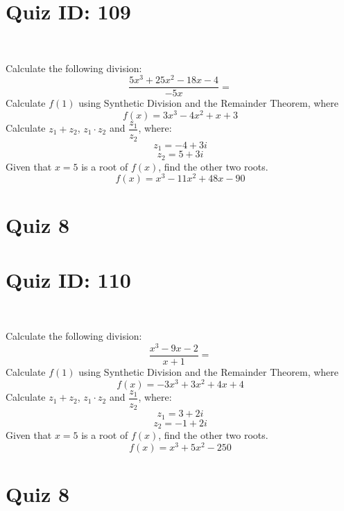 \documentclass{exam}
\begin{document}
\section*{Quiz ID: 109}
\vspace{0.5cm}\
\vspace{1cm}\
\begin{questions}
\question Calculate the following division:\[\dfrac{
5x^3 + 25x^2 - 18x - 4}{
-5x}=\] \makeemptybox{\stretch{2}}
\question Calculate $f(1)$ using Synthetic Division and the Remainder Theorem, where\[f(x) = 
3x^3 - 4x^2 + x + 3\]
\newpage\question Calculate $z_1+z_2$, $z_1\cdot z_2$ and $\dfrac{z_1}{z_2}$, where:\[z_1=-4+3\mathit{i}\]\[z_2=5+3\mathit{i}\]
\question Given that $x=5$ is a root of $f(x)$, find the other two roots.\[f(x)=
x^3 - 11x^2 + 48x - 90\]\makeemptybox{\stretch{1}}
\end{questions}\newpage
\newpage
\section*{Quiz 8}
\section*{Quiz ID: 110}
\vspace{0.5cm}\
\vspace{1cm}\
\begin{questions}
\question Calculate the following division:\[\dfrac{
x^3 - 9x - 2}{
x + 1}=\] 
\question Calculate $f(1)$ using Synthetic Division and the Remainder Theorem, where\[f(x) = 
-3x^3 + 3x^2 + 4x + 4\]
\newpage\question Calculate $z_1+z_2$, $z_1\cdot z_2$ and $\dfrac{z_1}{z_2}$, where:\[z_1=3+2\mathit{i}\]\[z_2=-1+2\mathit{i}\]\makeemptybox{\stretch{1}}
\question Given that $x=5$ is a root of $f(x)$, find the other two roots.\[f(x)=
x^3 + 5x^2 - 250\]\makeemptybox{\stretch{1}}
\end{questions}\newpage
\newpage
\section*{Quiz 8}
\end{document}
